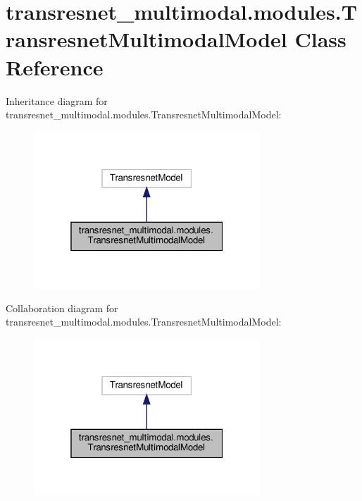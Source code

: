 \hypertarget{classtransresnet__multimodal_1_1modules_1_1TransresnetMultimodalModel}{}\section{transresnet\+\_\+multimodal.\+modules.\+Transresnet\+Multimodal\+Model Class Reference}
\label{classtransresnet__multimodal_1_1modules_1_1TransresnetMultimodalModel}


Inheritance diagram for transresnet\+\_\+multimodal.\+modules.\+Transresnet\+Multimodal\+Model\+:
\nopagebreak
\begin{figure}[H]
\begin{center}
\leavevmode
\includegraphics[width=241pt]{classtransresnet__multimodal_1_1modules_1_1TransresnetMultimodalModel__inherit__graph}
\end{center}
\end{figure}


Collaboration diagram for transresnet\+\_\+multimodal.\+modules.\+Transresnet\+Multimodal\+Model\+:
\nopagebreak
\begin{figure}[H]
\begin{center}
\leavevmode
\includegraphics[width=241pt]{classtransresnet__multimodal_1_1modules_1_1TransresnetMultimodalModel__coll__graph}
\end{center}
\end{figure}
